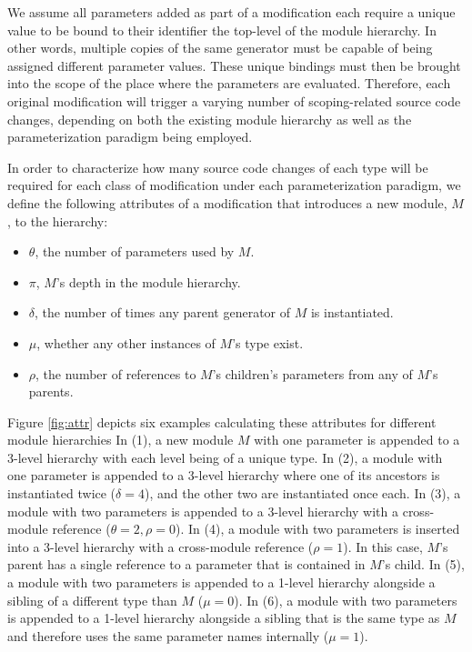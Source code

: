 We assume all parameters added as part of a modification each require a unique value to be bound to their identifier the top-level of the module hierarchy.
In other words, multiple copies of the same generator must be capable of being assigned different parameter values.
These unique bindings must then be brought into the scope of the place where the parameters are evaluated.
Therefore, each original modification will trigger a varying number of scoping-related source code changes,
depending on both the existing module hierarchy as well as the parameterization paradigm being employed.

In order to characterize how many source code changes of each type will be required for each class of modification under each parameterization paradigm,
we define the following attributes of a modification that introduces a new module, $M$, to the hierarchy:
\begin{itemize}%
\item $\theta$, the number of parameters used by $M$.
\item $\pi$, $M$'s depth in the module hierarchy.
\item $\delta$, the number of times any parent generator of $M$ is instantiated.
\item $\mu$, whether any other instances of $M$'s type exist.
\item $\rho$, the number of references to $M$'s children's parameters from any of $M$'s parents.
\end{itemize}

Figure \ref{fig:attr} depicts six examples calculating these attributes for different module hierarchies
In (1), a new module $M$ with one parameter is appended to a 3-level hierarchy with each level being of a unique type.
In (2), a module with one parameter is appended to a 3-level hierarchy where one of its ancestors is instantiated twice ($\delta = 4$), and the other two are instantiated once each.
In (3), a module with two parameters is appended to a 3-level hierarchy with a cross-module reference ($\theta = 2, \rho = 0$).
In (4), a module with two parameters is inserted into a 3-level hierarchy with a cross-module reference ($\rho = 1$).
In this case, $M$'s parent has a single reference to a parameter that is contained in $M$'s child.
In (5), a module with two parameters is appended to a 1-level hierarchy alongside a sibling of a different type than $M$ ($\mu = 0$).
In (6), a module with two parameters is appended to a 1-level hierarchy alongside a sibling that is the same type as $M$ and therefore uses the same parameter names internally ($\mu = 1$).

